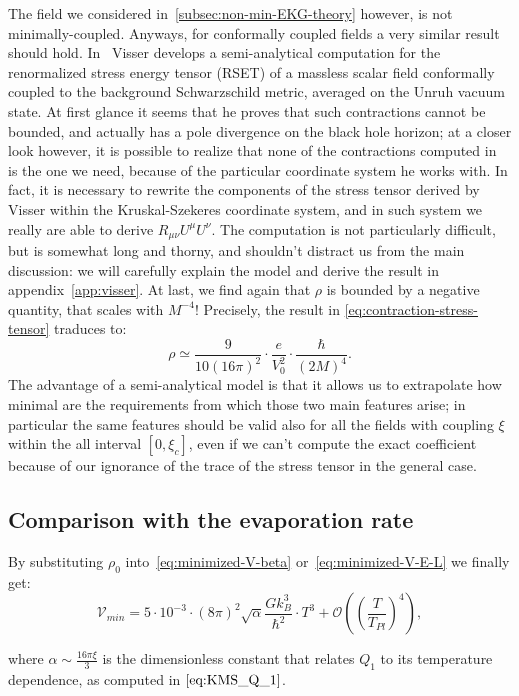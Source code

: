 The field we considered in~\ref{subsec:non-min-EKG-theory} however, is not minimally-coupled. Anyways, for conformally coupled fields a very similar result should hold. 
In~\cite{visser1997gravitational} Visser develops a semi-analytical computation for the renormalized stress energy tensor (RSET) of a massless scalar field conformally coupled to the background Schwarzschild metric, averaged on the Unruh vacuum state. At first glance it seems that he proves that such contractions cannot be bounded, and actually has a pole divergence on the black hole horizon; at a closer look however, it is possible to realize that none of the contractions computed in~\cite{visser1997gravitational} is the one we need, because of the particular coordinate system he works with. In fact, it is necessary to rewrite the components of the stress tensor derived by Visser within the Kruskal-Szekeres coordinate system, and in such system we really are able to derive \(R_{\mu\nu}U^{\mu}U^{\nu}\). The computation is not particularly difficult, but is somewhat long and thorny, and shouldn't distract us from the main discussion: we will carefully explain the model and derive the result in appendix~\ref{app:visser}. At last, we find again that \(\rho\) is bounded by a negative quantity, that scales with \(M^{-4}\)! Precisely, the result in \eqref{eq:contraction-stress-tensor} traduces to:
\[
	\rho \simeq \frac{9}{10(16\pi)^2} \cdot \frac{e}{V_0^2} \cdot \frac{\hbar}{(2M)^4}.
\] 
The advantage of a semi-analytical model is that it allows us to extrapolate how minimal are the requirements from which those two main features arise; in particular the same features should be valid also for all the fields with coupling \(\xi\) within the all interval \([0,\xi_c]\), even if we can't compute the exact coefficient because of our ignorance of the trace of the stress tensor in the general case.

\subsection{Comparison with the evaporation rate}
By substituting \(\rho_0\) into~\eqref{eq:minimized-V-beta} or~\eqref{eq:minimized-V-E-L} we finally get:
\begin{equation}
	\label{eq:KMS-minimized-V-beta}
	\mathcal{V}_{min} = 5\cdot10^{-3} \cdot (8\pi)^2\sqrt{\alpha} \frac{Gk_B^3}{\hbar^2} \cdot T^3 + \mathcal{O}\left(\left(\frac{T}{T_{Pl}}\right)^4\right),
\end{equation}

where \(\alpha \sim \frac{16\pi\xi}{3}\) is the dimensionless constant that relates \(Q_1\) to its temperature dependence, as computed in \(\eqref{eq:KMS_Q_1}\).

